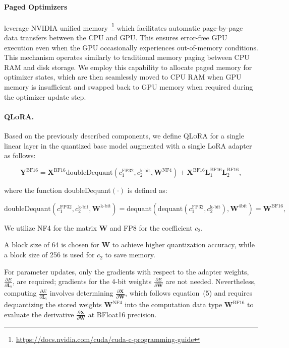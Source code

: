\paragraph{Paged Optimizers} leverage NVIDIA unified memory~\footnote{\tiny \url{https://docs.nvidia.com/cuda/cuda-c-programming-guide}} which facilitates automatic page-by-page data transfers between the CPU and GPU. This ensures error-free GPU execution even when the GPU occasionally experiences out-of-memory conditions. This mechanism operates similarly to traditional memory paging between CPU RAM and disk storage. We employ this capability to allocate paged memory for optimizer states, which are then seamlessly moved to CPU RAM when GPU memory is insufficient and swapped back to GPU memory when required during the optimizer update step.

\paragraph{\textsc{QLoRA}.} Based on the previously described components, we define \textsc{QLoRA} for a single linear layer in the quantized base model augmented with a single LoRA adapter as follows:

\begin{equation}
    \mathbf{Y}^{\text{BF16}} =  \mathbf{X}^{\text{BF16}} \text{doubleDequant}(c_1^{\text{FP32}}, c_2^{\text{k-bit}}, \mathbf{W}^{\text{NF4}}) + \mathbf{X}^{\text{BF16}}\mathbf{L}^{\text{BF16}}_1\mathbf{L}^{\text{BF16}}_2,
\end{equation}

where the function doubleDequant$(\cdot)$ is defined as:

\begin{equation}
    \text{doubleDequant}(c_1^{\text{FP32}}, c_2^{\text{k-bit}}, \mathbf{W}^{\text{k-bit}}) = \text{dequant}(\text{dequant}(c_1^{\text{FP32}}, c_2^{\text{k-bit}}), \mathbf{W}^{\text{4bit}}) = \mathbf{W}^{\text{BF16}},
\end{equation}

We utilize NF4 for the matrix $\mathbf{W}$ and FP8 for the coefficient $c_2$.

A block size of 64 is chosen for $\mathbf{W}$ to achieve higher quantization accuracy, while a block size of 256 is used for $c_2$ to save memory.

For parameter updates, only the gradients with respect to the adapter weights, $\frac{\partial E}{\partial \mathbf{L}_i}$, are required; gradients for the 4-bit weights $\frac{\partial E}{\partial \mathbf{W}}$ are not needed. Nevertheless, computing $\frac{\partial E}{\partial \mathbf{L}_i}$ involves determining $\frac{\partial \mathbf{X}}{\partial \mathbf{W}}$, which follows equation~(5) and requires dequantizing the stored weights $\mathbf{W}^{\text{NF4}}$ into the computation data type $\mathbf{W}^{\text{BF16}}$ to evaluate the derivative $\frac{\partial \mathbf{X}}{\partial \mathbf{W}}$ at BFloat16 precision.

